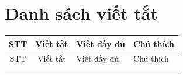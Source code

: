 \chapter*{Danh sách viết tắt}

\begin{center}
	\renewcommand{\arraystretch}{1.5}
	\begin{longtable}{|c|c|p{5cm}|p{6cm}|}
		\hline
		STT & Viết tắt & \centering Viết đầy đủ & \centering\arraybackslash Chú thích \\ \hline
		\endfirsthead
		
		\hline
		STT & Viết tắt & \centering Viết đầy đủ & \centering\arraybackslash Chú thích \\ \hline
		\endhead
		
		\hline
		\endfoot
		

\end{longtable}
\end{center}
